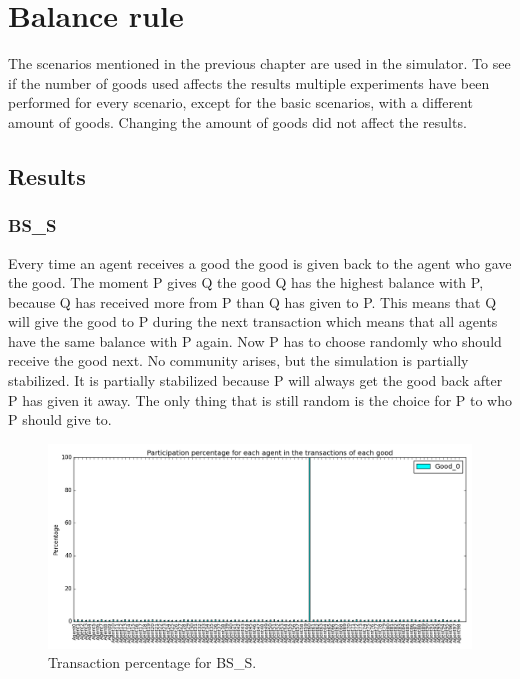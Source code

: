 \documentclass[twoside,openright]{uva-bachelor-thesis}
\begin{document}
\section{Balance rule}
The scenarios mentioned in the previous chapter are used in the simulator. To see if the number of goods used affects the results multiple experiments have been performed for every scenario, except for the basic scenarios, with a different amount of goods. Changing the amount of goods did not affect the results.
\subsection{Results}

\subsubsection{BS\_S}
Every time an agent receives a good the good is given back to the agent who gave the good. The moment P gives Q the good Q has the highest balance with P, because Q has received more from P than Q has given to P. This means that Q will give the good to P during the next transaction which means that all agents have the same balance with P again. Now P has to choose randomly who should receive the good next. No community arises, but the simulation is partially stabilized. It is partially stabilized because P will always get the good back after P has given it away. The only thing that is still random is the choice for P to who P should give to. \\
\begin{figure}[h!]
  \centering
   \includegraphics[scale=0.4]{Simulation_figures/BR_BS_S/Figure1_10k}
\caption{Transaction percentage for BS\_S.}
\end{figure}
\end{document}
